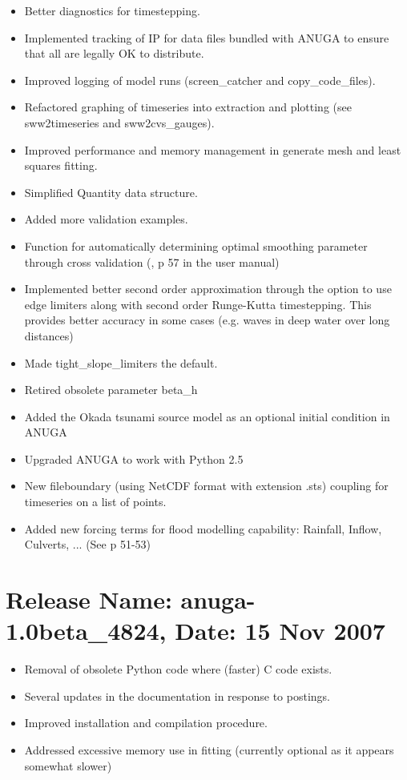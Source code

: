 \documentclass{manual}
\begin{document}
\begin{itemize}
  \item Better diagnostics for timestepping. 
  \item Implemented tracking of IP for data files bundled with ANUGA to ensure that all are legally OK to distribute.
  \item Improved logging of model runs (screen_catcher and copy_code_files).
  \item Refactored graphing of timeseries into extraction and plotting (see sww2timeseries and sww2cvs\_gauges).
  \item Improved performance and memory management in generate mesh and  least squares fitting.
  \item Simplified Quantity data structure.
  \item Added more validation examples. 
  \item Function for automatically determining optimal smoothing parameter through cross validation (, p 57 in the user manual)
  \item Implemented better second order approximation through the option to use edge limiters along with second order Runge-Kutta timestepping. 
        This provides better accuracy in some cases (e.g. waves in deep water over long distances)
  \item Made tight\_slope\_limiters the default.
  \item Retired obsolete parameter beta_h
  \item Added the Okada tsunami source model as an optional initial condition in ANUGA
  \item Upgraded ANUGA to work with Python 2.5
  \item New fileboundary (using NetCDF format with extension .sts) coupling for timeseries on a list of points.
  \item Added new forcing terms for flood modelling capability: Rainfall, Inflow, Culverts, ... (See p 51-53)
\end{itemize}   
  
  
\section{Release Name: anuga-1.0beta\_4824, Date: 15 Nov 2007}

\begin{itemize} 
  \item Removal of obsolete Python code where (faster) C code exists. 
  \item Several updates in the documentation in response to postings. 
  \item Improved installation and compilation procedure. 
  \item Addressed excessive memory use in fitting (currently optional as it appears somewhat slower) 
\end{itemize} 
\end{document}
